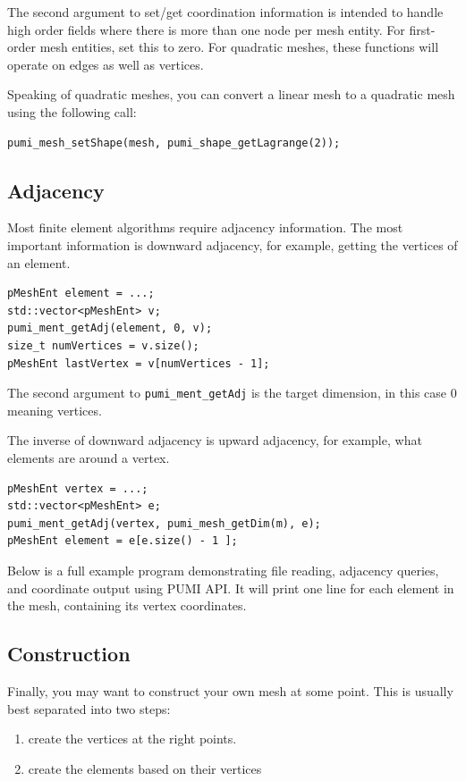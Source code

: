 \documentclass{article}
\begin{document}
The second argument to set/get coordination information is intended to handle
high order fields where there is more than one node
per mesh entity.
For first-order mesh entities, set this to zero.
For quadratic meshes, these functions will operate on edges as well as vertices.

Speaking of quadratic meshes, you can convert a linear mesh
to a quadratic mesh using the following call:

\begin{lstlisting}
pumi_mesh_setShape(mesh, pumi_shape_getLagrange(2));
\end{lstlisting}

\subsection{Adjacency}

Most finite element algorithms require adjacency information.
The most important information is downward adjacency, for
example, getting the vertices of an element.

\begin{lstlisting}
pMeshEnt element = ...;
std::vector<pMeshEnt> v;
pumi_ment_getAdj(element, 0, v);
size_t numVertices = v.size();
pMeshEnt lastVertex = v[numVertices - 1];
\end{lstlisting}

The second argument to {\texttt{pumi\_ment\_getAdj}}
is the target dimension, in this case 0 meaning vertices.

The inverse of downward adjacency is upward adjacency,
for example, what elements are around a vertex.

\begin{lstlisting}
pMeshEnt vertex = ...;
std::vector<pMeshEnt> e;
pumi_ment_getAdj(vertex, pumi_mesh_getDim(m), e);
pMeshEnt element = e[e.size() - 1 ];
\end{lstlisting}

Below is a full example program demonstrating file reading,
adjacency queries, and coordinate output using PUMI API.
It will print one line for each element in the mesh,
containing its vertex coordinates.



\subsection{Construction}
\label{sec:gen}

Finally, you may want to construct your own mesh at
some point.
This is usually best separated into two steps:
\begin{enumerate}
\item create the vertices at the right points.
\item create the elements based on their vertices
\end{enumerate}
\end{document}
